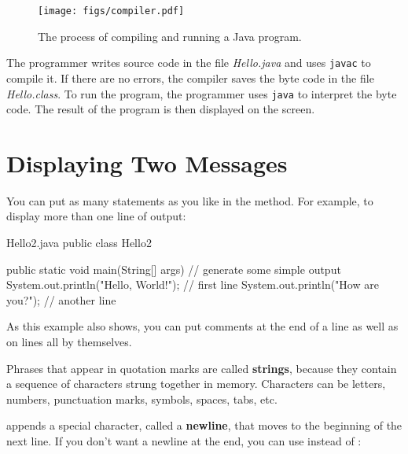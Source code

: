 \begin{figure}[!ht]
\begin{center}
\texttt{[image: figs/compiler.pdf]}
\caption{The process of compiling and running a Java program.}
\label{fig.compiler}
\end{center}
\end{figure}

The programmer writes source code in the file {\it Hello.java} and uses {\tt javac} to compile it.
If there are no errors, the compiler saves the byte code in the file {\it Hello.class}.
To run the program, the programmer uses {\tt java} to interpret the byte code.
The result of the program is then displayed on the screen.


\section{Displaying Two Messages}

You can put as many statements as you like in the  method.
For example, to display more than one line of output:

\begin{trinket}[250]{Hello2.java}
public class Hello2 {

    public static void main(String[] args) {
        // generate some simple output
        System.out.println("Hello, World!");  // first line
        System.out.println("How are you?");   // another line
    }
}
\end{trinket}

As this example also shows, you can put comments at the end of a line as well as on lines all by themselves.


Phrases that appear in quotation marks are called {\bf strings}, because they contain a sequence of characters strung together in memory.
Characters can be letters, numbers, punctuation marks, symbols, spaces, tabs, etc.


 appends a special character, called a {\bf newline}, that moves to the beginning of the next line.
If you don't want a newline at the end, you can use  instead of :


